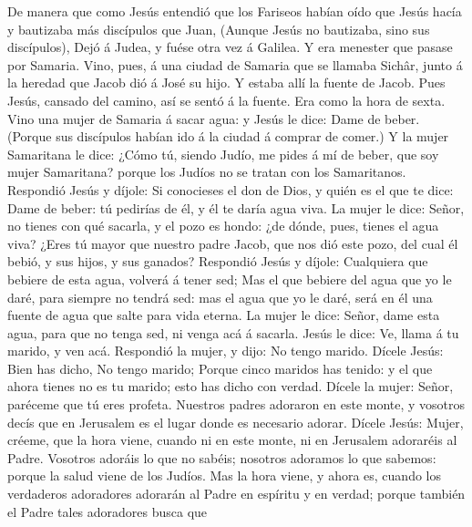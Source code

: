  De manera que como Jesús entendió que los Fariseos habían
oído que Jesús hacía y bautizaba más discípulos que Juan, 
(Aunque Jesús no bautizaba, sino sus discípulos),  Dejó á
Judea, y fuése otra vez á Galilea.  Y era menester que
pasase por Samaria.  Vino, pues, á una ciudad de Samaria
que se llamaba Sichâr, junto á la heredad que Jacob dió á José su hijo.
 Y estaba allí la fuente de Jacob. Pues Jesús, cansado del
camino, así se sentó á la fuente. Era como la hora de sexta.
 Vino una mujer de Samaria á sacar agua: y Jesús le dice:
Dame de beber.  (Porque sus discípulos habían ido á la
ciudad á comprar de comer.)  Y la mujer Samaritana le
dice: ¿Cómo tú, siendo Judío, me pides á mí de beber, que soy mujer
Samaritana? porque los Judíos no se tratan con los Samaritanos.
 Respondió Jesús y díjole: Si conocieses el don de Dios,
y quién es el que te dice: Dame de beber: tú pedirías de él, y él te
daría agua viva.  La mujer le dice: Señor, no tienes con
qué sacarla, y el pozo es hondo: ¿de dónde, pues, tienes el agua viva?
 ¿Eres tú mayor que nuestro padre Jacob, que nos dió este
pozo, del cual él bebió, y sus hijos, y sus ganados? 
Respondió Jesús y díjole: Cualquiera que bebiere de esta agua, volverá á
tener sed;  Mas el que bebiere del agua que yo le daré,
para siempre no tendrá sed: mas el agua que yo le daré, será en él una
fuente de agua que salte para vida eterna.  La mujer le
dice: Señor, dame esta agua, para que no tenga sed, ni venga acá á
sacarla.  Jesús le dice: Ve, llama á tu marido, y ven
acá.  Respondió la mujer, y dijo: No tengo marido. Dícele
Jesús: Bien has dicho, No tengo marido;  Porque cinco
maridos has tenido: y el que ahora tienes no es tu marido; esto has
dicho con verdad.  Dícele la mujer: Señor, paréceme que
tú eres profeta.  Nuestros padres adoraron en este monte,
y vosotros decís que en Jerusalem es el lugar donde es necesario adorar.
 Dícele Jesús: Mujer, créeme, que la hora viene, cuando
ni en este monte, ni en Jerusalem adoraréis al Padre. 
Vosotros adoráis lo que no sabéis; nosotros adoramos lo que sabemos:
porque la salud viene de los Judíos.  Mas la hora viene,
y ahora es, cuando los verdaderos adoradores adorarán al Padre en
espíritu y en verdad; porque también el Padre tales adoradores busca que
